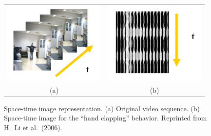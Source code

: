 \begin{figure}[t]
    \centering
    \begin{tabular}{cc}
        \includegraphics[width=2in]{figures/space-time-original.png} &
        \includegraphics[width=2in]{figures/space-time-image.png} \\
        (a) & (b)
    \end{tabular}
    \caption[Space-time image representation.]{\small Space-time image
        representation. (a) Original video sequence. (b) Space-time image
        for the ``hand clapping'' behavior. Reprinted from H.\ Li et al.\
        (2006).}
    \label{fig:space-time-feature}
\end{figure}

